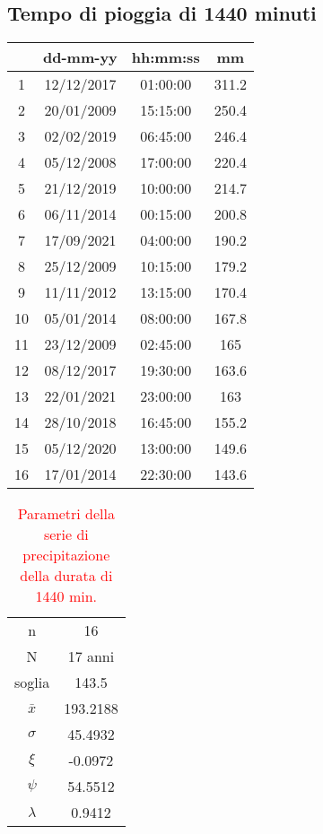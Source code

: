 \subsection{Tempo di pioggia di 1440 minuti}
\begin{table}[H] \centering
    \begin{tabular}{cccc}
    \toprule
       & dd-mm-yy   & hh:mm:ss & mm  \\
    \midrule
    1  & 12/12/2017 & 01:00:00 & 311.2 \\
    2  & 20/01/2009 & 15:15:00 & 250.4 \\
    3  & 02/02/2019 & 06:45:00 & 246.4 \\
    4  & 05/12/2008 & 17:00:00 & 220.4 \\
    5  & 21/12/2019 & 10:00:00 & 214.7 \\
    6  & 06/11/2014 & 00:15:00 & 200.8 \\
    7  & 17/09/2021 & 04:00:00 & 190.2 \\
    8  & 25/12/2009 & 10:15:00 & 179.2 \\
    9  & 11/11/2012 & 13:15:00 & 170.4 \\
    10 & 05/01/2014 & 08:00:00 & 167.8 \\
    11 & 23/12/2009 & 02:45:00 & 165   \\
    12 & 08/12/2017 & 19:30:00 & 163.6 \\
    13 & 22/01/2021 & 23:00:00 & 163   \\
    14 & 28/10/2018 & 16:45:00 & 155.2 \\
    15 & 05/12/2020 & 13:00:00 & 149.6 \\
    16 & 17/01/2014 & 22:30:00 & 143.6 \\
    \bottomrule
    \end{tabular}
    \end{table}

    \begin{table}[H] \centering
        \caption{\textcolor{red}{Parametri della serie di precipitazione della durata di 1440 min.}}
        \begin{tabular}{cc}
            \toprule
        n        &   16      \\
        N        & 17 anni \\
        soglia   &     143.5    \\
        $\bar{x}$ &    193.2188\\
        $\sigma$ &     45.4932    \\
        $\xi$      &     -0.0972  \\
        $\psi$      &   54.5512  \\
        $\lambda$   &   0.9412 \\
    \bottomrule    
    \end{tabular}
        \end{table}    
